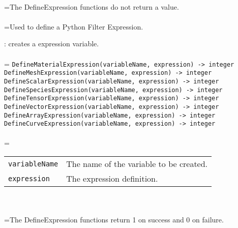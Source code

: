 \documentclass[10pt,a4paper]{report}
\begin{document}
 \\ 
\hangindent=\parindent The DefineExpression functions do not return a value. \\[-3mm] 

 \\ 
\hangindent=\parindent Used to define a Python Filter Expression. \\[-3mm] 

\newpage


{}
: creates a expression variable.\\[-3mm]

 \\ 
\hangindent=\parindent 
\verb!DefineMaterialExpression(variableName, expression) -> integer!\\ 
\verb!DefineMeshExpression(variableName, expression) -> integer!\\ 
\verb!DefineScalarExpression(variableName, expression) -> integer!\\ 
\verb!DefineSpeciesExpression(variableName, expression) -> integer!\\ 
\verb!DefineTensorExpression(variableName, expression) -> integer!\\ 
\verb!DefineVectorExpression(variableName, expression) -> integer!\\ 
\verb!DefineArrayExpression(variableName, expression) -> integer!\\ 
\verb!DefineCurveExpression(variableName, expression) -> integer!\\ [-3mm]

 \\ 
\hangindent=\parindent 
\begin{tabular}{ll}
\verb!variableName! & The name of the variable to be created. \\
\verb!expression! & The expression definition. \\
\end{tabular} \\[-2mm]


 \\ 
\hangindent=\parindent The DefineExpression functions return 1 on success and 0 on failure. \\[-3mm] 
\end{document}
